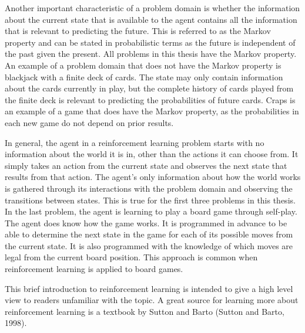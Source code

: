 Another important characteristic of a problem domain is whether the information about the current state that is available to the agent contains all the information that is relevant to predicting the future.  This is referred to as the Markov property and can be stated in probabilistic terms as the future is independent of the past given the present.  All problems in this thesis have the Markov property.  An example of a problem domain that does not have the Markov property is blackjack with a finite deck of cards.  The state may only contain information about the cards currently in play, but the complete history of cards played from the finite deck is relevant to predicting the probabilities of future cards.  Craps is an example of a game that does have the Markov property, as the probabilities in each new game do not depend on prior results.

In general, the agent in a reinforcement learning problem starts with no information about the world it is in, other than the actions it can choose from.  It simply takes an action from the current state and observes the next state that results from that action.  The agent’s only information about how the world works is gathered through its interactions with the problem domain and observing the transitions between states.  This is true for the first three problems in this thesis.  In the last problem, the agent is learning to play a board game through self-play.  The agent does know how the game works.  It is programmed in advance to be able to determine the next state in the game for each of its possible moves from the current state.  It is also programmed with the knowledge of which moves are legal from the current board position.  This approach is common when reinforcement learning is applied to board games.

This brief introduction to reinforcement learning is intended to give a high level view to readers unfamiliar with the topic.  A great source for learning more about reinforcement learning is a textbook by Sutton and Barto (Sutton and Barto, 1998).
